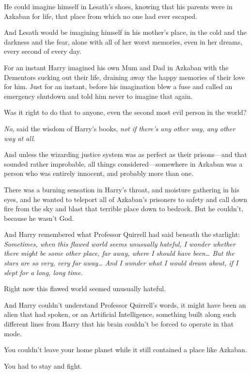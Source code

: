 He could imagine himself in Lesath's shoes, knowing that his parents were in Azkaban for life, that place from which no one had ever escaped.

And Lesath would be imagining himself in his mother's place, in the cold and the darkness and the fear, alone with all of her worst memories, even in her dreams, every second of every day.

For an instant Harry imagined his own Mum and Dad in Azkaban with the Dementors sucking out their life, draining away the happy memories of their love for him. Just for an instant, before his imagination blew a fuse and called an emergency shutdown and told him never to imagine that again.

Was it right to do that to anyone, even the second most evil person in the world?

\emph{No,} said the wisdom of Harry's books, \emph{not if there's any other way, any other way at all}.

And unless the wizarding justice system was as perfect as their prisons—and that sounded rather improbable, all things considered—somewhere in Azkaban was a person who was entirely innocent, and probably more than one.

There was a burning sensation in Harry's throat, and moisture gathering in his eyes, and he wanted to teleport all of Azkaban's prisoners to safety and call down fire from the sky and blast that terrible place down to bedrock. But he couldn't, because he wasn't God.

And Harry remembered what Professor Quirrell had said beneath the starlight: \emph{Sometimes, when this flawed world seems unusually hateful, I wonder whether there might be some other place, far away, where I should have been{\ldots} But the stars are so very, very far away{\ldots} And I wonder what I would dream about, if I slept for a long, long time.}

Right now this flawed world seemed unusually hateful.

And Harry couldn't understand Professor Quirrell's words, it might have been an alien that had spoken, or an Artificial Intelligence, something built along such different lines from Harry that his brain couldn't be forced to operate in that mode.

You couldn't leave your home planet while it still contained a place like Azkaban.

You had to stay and fight.

